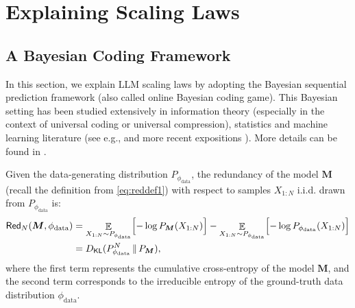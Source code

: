 \documentclass[11pt]{article}
\theoremstyle{plain}
\theoremstyle{definition}
\newcommand{\DKL}{D_{\mathsf{KL}}}
\newcommand{\redundency}{\mathsf{Red}}
\newcommand{\Model}{\boldsymbol{M}}
\newcommand{\dataModel}{\phi_{\text{data}}}
\DeclareMathOperator*{\E}{\mathbb{E}}
\newcommand{\jian}[1]{{\it \color{red}{Jian: #1}}}
\begin{document}
\section{Explaining Scaling Laws}
\setlength{\textfloatsep}{8pt}
\label{sec:mainscalinglaws}

\subsection{A Bayesian Coding Framework}
\label{sec:Bayesian Framework}
In this section, we 
explain LLM scaling laws by
adopting the Bayesian sequential prediction framework
(also called online Bayesian coding game). This Bayesian setting has been studied extensively in information theory (especially in the context of universal coding
or universal compression), statistics and machine learning literature (see e.g., \citep{clarke1990information,clarke1994jeffreys}
and more recent expositions \citep{duchi2024lecture,jeon2024information}).
More details can be found in .


Given the data-generating distribution \( P_{\dataModel} \), the redundancy of the model \( \Model \) (recall the definition from \eqref{eq:reddef1})
with respect to samples \( X_{1:N} \) i.i.d. drawn from \( P_{\dataModel} \) is:
\begin{align}
\label{redundancy}
    \redundency_N(\Model, \dataModel) 
&= \E\limits_{X_{1:N}\sim P_{\dataModel}} \Bigl[ -\log P_{\Model}(X_{1:N}) \Bigr] 
- \E\limits_{X_{1:N}\sim P_{\dataModel}} \Bigl[ -\log P_{\dataModel}(X_{1:N}) \Bigr] \\
&= \DKL(P_{\dataModel}^N \,\Vert\, P_{\Model}), \notag
\end{align}
where the first term represents the cumulative cross-entropy of the model \( \Model \), and the second term corresponds to the irreducible entropy of the ground-truth data distribution \( \dataModel \).


\end{document}
